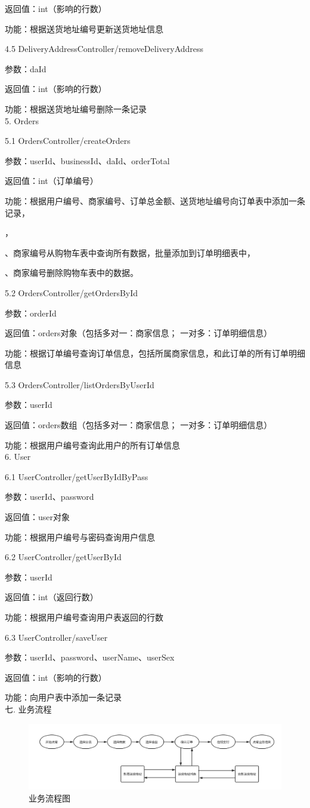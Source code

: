 返回值：int（影响的行数）

功能：根据送货地址编号更新送货地址信息

4.5 DeliveryAddressController/removeDeliveryAddress 

参数：daId 

返回值：int（影响的行数）

功能：根据送货地址编号删除一条记录~\\

5. Orders

5.1 OrdersController/createOrders 

参数：userId、businessId、daId、orderTotal 

返回值：int（订单编号）

功能：根据用户编号、商家编号、订单总金额、送货地址编号向订单表中添加一条记录，

\qquad{}，

\qquad{}、商家编号从购物车表中查询所有数据，批量添加到订单明细表中，

\qquad{}、商家编号删除购物车表中的数据。

5.2 OrdersController/getOrdersById 

参数：orderId 

返回值：orders对象（包括多对一：商家信息； 一对多：订单明细信息）

功能：根据订单编号查询订单信息，包括所属商家信息，和此订单的所有订单明细信息

5.3 OrdersController/listOrdersByUserId 

参数：userId 

返回值：orders数组（包括多对一：商家信息； 一对多：订单明细信息）

功能：根据用户编号查询此用户的所有订单信息~\\

6. User

6.1 UserController/getUserByIdByPass 

参数：userId、password 

返回值：user对象

功能：根据用户编号与密码查询用户信息

6.2 UserController/getUserById 

参数：userId 

返回值：int（返回行数）

功能：根据用户编号查询用户表返回的行数

6.3 UserController/saveUser 

参数：userId、password、userName、userSex

返回值：int（影响的行数）

功能：向用户表中添加一条记录~\\

\noindent
七. 业务流程

\begin{figure}[H]
    \centering
    \includegraphics[scale=0.45]{figures/flowchart.png}
    \caption{业务流程图}
\end{figure}

